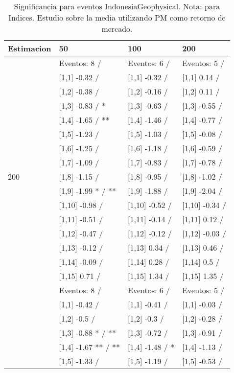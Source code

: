 \begin{table}

\caption{Significancia para eventos IndonesiaGeophysical. Nota: para Indices. Estudio sobre la media utilizando PM como retorno de mercado.}
\centering
\begin{tabular}[t]{llll}
\toprule
Estimacion & 50 & 100 & 200\\
\midrule
 & Eventos:  8 / & Eventos:  6 / & Eventos:  5 /\\
 & {}[1,1] -0.32  / & {}[1,1] -0.32  / & {}[1,1] 0.14  /\\
 & {}[1,2] -0.38  / & {}[1,2] -0.16  / & {}[1,2] 0.11  /\\
 & {}[1,3] -0.83  / * & {}[1,3] -0.63  / & {}[1,3] -0.55  /\\
 & {}[1,4] -1.65  / ** & {}[1,4] -1.46  / & {}[1,4] -0.77  /\\
\addlinespace
 & {}[1,5] -1.23  / & {}[1,5] -1.03  / & {}[1,5] -0.08  /\\
 & {}[1,6] -1.25  / & {}[1,6] -1.18  / & {}[1,6] -0.59  /\\
 & {}[1,7] -1.09  / & {}[1,7] -0.83  / & {}[1,7] -0.78  /\\
200 & {}[1,8] -1.15  / & {}[1,8] -0.95  / & {}[1,8] -1.02  /\\
 & {}[1,9] -1.99 * / ** & {}[1,9] -1.88  / & {}[1,9] -2.04  /\\
\addlinespace
 & {}[1,10] -0.98  / & {}[1,10] -0.52  / & {}[1,10] -0.34  /\\
 & {}[1,11] -0.51  / & {}[1,11] -0.14  / & {}[1,11] 0.12  /\\
 & {}[1,12] -0.47  / & {}[1,12] -0.12  / & {}[1,12] -0.03  /\\
 & {}[1,13] -0.12  / & {}[1,13] 0.34  / & {}[1,13] 0.46  /\\
 & {}[1,14] -0.09  / & {}[1,14] 0.28  / & {}[1,14] 0.5  /\\
\addlinespace
 & {}[1,15] 0.71  / & {}[1,15] 1.34  / & {}[1,15] 1.35  /\\
 & Eventos:  8 / & Eventos:  6 / & Eventos:  5 /\\
 & {}[1,1] -0.42  / & {}[1,1] -0.41  / & {}[1,1] -0.03  /\\
 & {}[1,2] -0.5  / & {}[1,2] -0.3  / & {}[1,2] -0.28  /\\
 & {}[1,3] -0.88 * / ** & {}[1,3] -0.72  / & {}[1,3] -0.91  /\\
\addlinespace
 & {}[1,4] -1.67 ** / ** & {}[1,4] -1.48  / * & {}[1,4] -1.13  /\\
 & {}[1,5] -1.33  / & {}[1,5] -1.19  / & {}[1,5] -0.53  /\\

\end{tabular}
\end{table}
